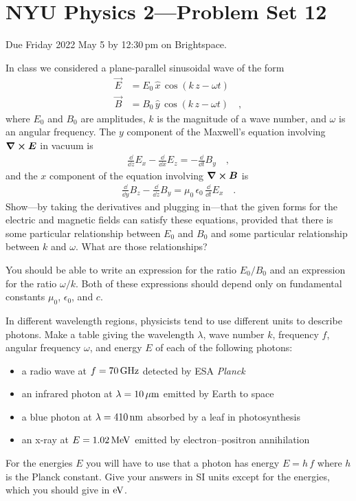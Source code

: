 \documentclass[12pt]{article}
\begin{document}
\section*{NYU Physics 2---Problem Set 12}

Due Friday 2022 May 5 by 12:30\,pm on Brightspace.

\startproblem\label{prob:wave}%
In class we considered a plane-parallel sinusoidal wave of the form
\begin{align}
  \vec{E} &= E_0\,\hat{x}\,\cos(k\,z - \omega t) \\
  \vec{B} &= B_0\,\hat{y}\,\cos(k\,z - \omega t) \quad ,
\end{align}
where $E_0$ and $B_0$ are amplitudes, $k$ is the magnitude of a
wave number, and $\omega$ is an angular frequency.
The $y$ component of the Maxwell's equation involving
$\curl{\boldsymbol{E}}$ in vacuum is
\begin{align}
  \frac{\dd}{\dd z}E_x - \frac{\dd}{\dd x}E_z = -\frac{\dd}{\dd t}B_y
  \quad ,
\end{align}
and the $x$ component of the equation involving $\curl{\boldsymbol{B}}$ is
\begin{align}
  \frac{\dd}{\dd y}B_z - \frac{\dd}{\dd z}B_y = \mu_0\,\epsilon_0\,\frac{\dd}{\dd t}E_x
  \quad .
\end{align}
Show---by taking the derivatives and plugging in---that the given forms
for the electric and magnetic fields can
satisfy these equations, provided that there is some particular relationship
between $E_0$ and $B_0$ and some particular relationship between $k$ and $\omega$.
What are those relationships?

You should be able to write an
expression for the ratio $E_0/B_0$ and an expression for the ratio $\omega/k$.
Both of these expressions should depend only on fundamental constants
$\mu_0$, $\epsilon_0$, and $c$.

\startproblem%
In different wavelength regions, physicists tend to use different
units to describe photons. Make a table giving the wavelength
$\lambda$, wave number $k$, frequency $f$, angular frequency $\omega$,
and energy $E$ of each of the following photons:
\begin{itemize}
\item a radio wave at $f=70\,\mathrm{GHz}$ detected by ESA \textsl{Planck}
\item an infrared photon at $\lambda=10\,\mathrm{\mu m}$ emitted by Earth to space
\item a blue photon at $\lambda=410\,\mathrm{nm}$ absorbed by a leaf in photosynthesis
\item an x-ray at $E=1.02\,\mathrm{MeV}$ emitted by electron--positron annihilation
\end{itemize}
For the energies $E$ you will have to use that a photon has energy $E=h\,f$
where $h$ is the Planck constant. Give your answers in SI units except for the
energies, which you should give in $\mathrm{eV}$.
\end{document}
